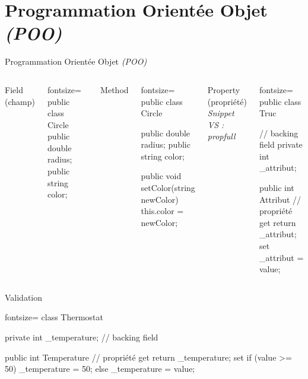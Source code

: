 \section{Programmation Orientée Objet \emph{(POO)}}

\begingroup
{}
\begin{frame}
    \begin{center}
        \vspace{1cm}
        {\Large\color{background}
        Programmation Orientée Objet \emph{(POO)}}
    \end{center}
\end{frame}
\endgroup

\begin{frame}[fragile]
  \begin{columns}[c]
    \column{2.3in}
    \begin{center}{\large Field (champ)}\end{center}
    \begin{csharpcode*}{fontsize=\scriptsize}
public class Circle
{
    public double radius;
    public string color;
}
    \end{csharpcode*}
    \pause
    \begin{center}{\large Method}\end{center}
    \begin{csharpcode*}{fontsize=\scriptsize}
public class Circle
{
    public double radius;
    public string color;

    public void setColor(string newColor)
    {
      this.color = newColor;
    }
}
    \end{csharpcode*}
    \column{2.2in}
    \pause
    \begin{center}
      {\large Property (propriété)}\\
      \emph{\scriptsize Snippet VS : propfull}
    \end{center}
    \begin{csharpcode*}{fontsize=\scriptsize}
public class Truc
{
    // backing field
    private int _attribut;

    public int Attribut // propriété
    {
        get { return _attribut; }
        set { _attribut = value; }
    }
}
    \end{csharpcode*}
  \end{columns}
\end{frame}

\begin{frame}[fragile]
    \begin{center}{\large Validation}\end{center}
    \begin{csharpcode*}{fontsize=\scriptsize}
class Thermostat
{
    private int _temperature; // backing field

    public int Temperature // propriété
    {
        get { return _temperature; }
        set
        {
            if (value >= 50)
                _temperature = 50;
            else
                _temperature = value;
        }
    }
}
    \end{csharpcode*}
\end{frame}


